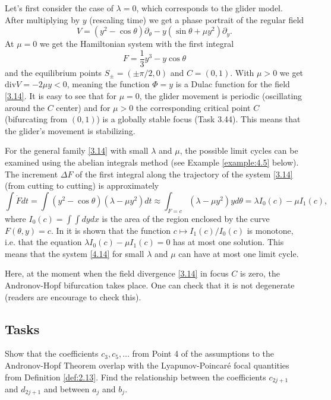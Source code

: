 \begin{example}
	Let's first consider the case of $\lambda = 0$, which corresponds to the glider model. After multiplying by $y$ (rescaling time) we get a phase portrait of the regular field
	\begin{equation}
	\label{3.15}
	V=(y^{2}-\cos \theta )\partial _{\theta }-y(\sin \theta +\mu y^{2})\partial
	_{y}.
	\end{equation}
	At $\mu =0$ we get the Hamiltonian system with the first integral
	$$
	F=\frac{1}{3}y^{3}-y\cos \theta
	$$
	and the equilibrium points $S_{\pm }=\left( \pm \pi /2,0\right) $ and $C=\left(
	0,1\right) $. With $\mu >0$ we get $\textrm{div}V=-2\mu y<0$, meaning the function $\Phi =y$ is a Dulac function for the field \eqref{3.14}. It is easy to see that for $\mu = 0$, the glider movement is periodic (oscillating around the $C$ center) and for $\mu > 0$ the corresponding critical point $C$ (bifurcating from $(0, 1)$) is a globally stable focus (Task 3.44). This means that the glider's movement is stabilizing.
	
	For the general family \eqref{3.14} with small $\lambda $ and $\mu $, the possible limit cycles can be examined using the abelian integrals method (see Example \eqref{example:4.5} below). The increment $\Delta F$ of the first integral along the trajectory of the system \eqref{3.14} (from cutting to cutting) is approximately
	$$
	\int \dot{F}dt=\int \left( y^{2}-\cos \theta \right) \left( \lambda -\mu
	y^{2}\right) dt\approx \int_{F=c}(\lambda -\mu y^{2})yd\theta =\lambda
	I_{0}(c)-\mu I_{1}(c),
	$$
	where $I_{0}(c)=\int \int dydx$ is the area of the region enclosed by the curve $F(\theta ,y)=c$. In \cite{BaLe} it is shown that the function $c\longmapsto I_{1}(c)/I_{0}(c)$ is monotone, i.e. that the equation $\lambda I_{0}(c)-\mu I_{1}(c)=0$ has at most one solution. This means that the system \eqref{4.14} for small $\lambda $ and $\mu $ can have at most one limit cycle.
	
	Here, at the moment when the field divergence \eqref{3.14} in focus $C$ is zero, the Andronov-Hopf bifurcation takes place. One can check that it is not degenerate (readers are encourage to check this).
\end{example}

\subsection*{Tasks}
\begin{task}
	Show that the coefficients $c_3, c_5,\ldots$ from Point 4 of the assumptions to the Andronov-Hopf Theorem overlap with the Lyapunov-Poincaré focal quantities from Definition \ref{def:2.13}. Find the relationship between the coefficients $c_{2j+1}$ and $d_{2j+1}$ and between $a_{j}$ and
	$b_{j}$.
\end{task}

